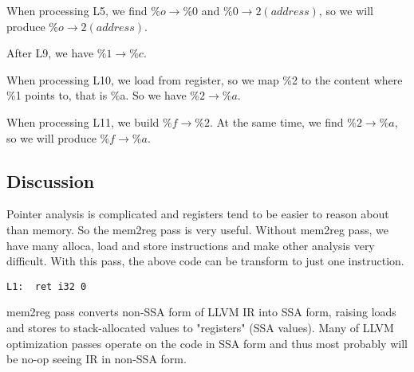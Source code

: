 When processing L5, we find $\%o \to \%0$ and $\%0 \to 2(address)$, so we will produce $\%o \to 2(address)$.

After L9, we have $\%1 \to \%c$.

When processing L10, we load from register, so we map \%2 to the content where \%1 points to, that is \%a. So we have
$\%2 \to \%a$.

When processing L11, we build $\%f \to \%2$. At the same time, we find $\%2 \to \%a$, so we will produce $\%f \to \%a$.

\subsection{Discussion}
Pointer analysis is complicated and registers tend to be easier to reason about than memory. So the mem2reg pass is very useful. Without mem2reg pass, we have many alloca, load and store instructions and make other analysis very difficult. With this pass, the above code can be transform to just one instruction.

\begin{verbatim}
L1:  ret i32 0
\end{verbatim}

mem2reg pass converts non-SSA form of LLVM IR into SSA form, raising loads and stores to stack-allocated values to "registers" (SSA values). Many of LLVM optimization passes operate on the code in SSA form and thus most probably will be no-op seeing IR in non-SSA form.

